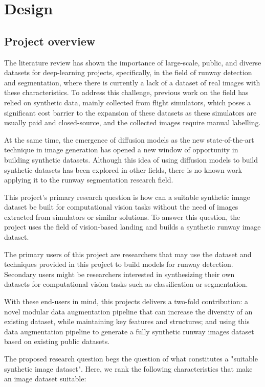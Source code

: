 
\chapter{Design}

\section{Project overview}

The literature review has shown the importance of large-scale, public, and diverse datasets for deep-learning projects, specifically, in the field of runway detection and segmentation, where there is currently a lack of a dataset of real images with these characteristics. To address this challenge, previous work on the field has relied on synthetic data, mainly collected from flight simulators, which poses a significant cost barrier to the expansion of these datasets as these simulators are usually paid and closed-source, and the collected images require manual labelling.

At the same time, the emergence of diffusion models as the new state-of-the-art technique in image generation has opened a new window of opportunity in building synthetic datasets. Although this idea of using diffusion models to build synthetic datasets has been explored in other fields, there is no known work applying it to the runway segmentation research field.

This project's primary research question is how can a suitable synthetic image dataset be built for computational vision tasks without the need of images extracted from simulators or similar solutions. To answer this question, the project uses the field of vision-based landing and builds a synthetic runway image dataset.

The primary users of this project are researchers that may use the dataset and techniques provided in this project to build models for runway detection. Secondary users might be researchers interested in synthesizing their own datasets for computational vision tasks such as classification or segmentation.

With these end-users in mind, this projects delivers a two-fold contribution: a novel modular data augmentation pipeline that can increase the diversity of an existing dataset, while maintaining key features and structures; and using this data augmentation pipeline to generate a fully synthetic runway images dataset based on existing public datasets.

The proposed research question begs the question of what constitutes a "suitable synthetic image dataset". Here, we rank the following characteristics that make an image dataset suitable:

